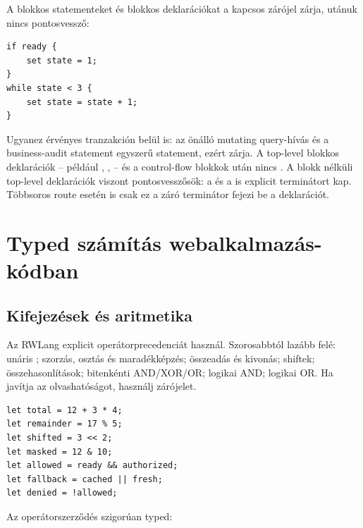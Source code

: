 A blokkos statementeket és blokkos deklarációkat a kapcsos zárójel zárja, utánuk nincs pontosvessző:

\begin{lstlisting}[language=RWLang]
if ready {
    set state = 1;
}
while state < 3 {
    set state = state + 1;
}
\end{lstlisting}

Ugyanez érvényes tranzakción belül is: az önálló mutating query-hívás és a business-audit statement egyszerű statement, ezért \code{;} zárja. A top-level blokkos deklarációk -- például , ,  -- és a control-flow blokkok után nincs \code{;}. A blokk nélküli top-level deklarációk viszont pontosvesszősök: a  és a  is explicit \code{;} terminátort kap. Többsoros route esetén is csak ez a záró terminátor fejezi be a deklarációt.

\section{Typed számítás webalkalmazás-kódban}

\subsection*{Kifejezések és aritmetika}

Az RWLang explicit operátorprecedenciát használ. Szorosabbtól lazább felé: unáris \code{!}; szorzás, osztás és maradékképzés; összeadás és kivonás; shiftek; összehasonlítások; bitenkénti AND/XOR/OR; logikai AND; logikai OR. Ha javítja az olvashatóságot, használj zárójelet.

\begin{lstlisting}[language=RWLang]
let total = 12 + 3 * 4;
let remainder = 17 % 5;
let shifted = 3 << 2;
let masked = 12 & 10;
let allowed = ready && authorized;
let fallback = cached || fresh;
let denied = !allowed;
\end{lstlisting}

Az operátorszerződés szigorúan typed:

